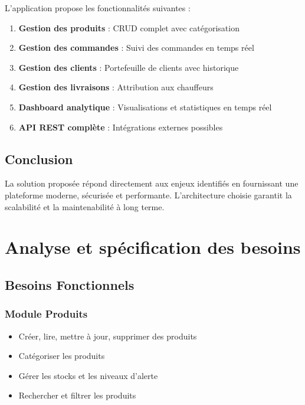 \documentclass[12pt,a4paper]{report}
\begin{document}
L'application propose les fonctionnalités suivantes :

\begin{enumerate}
    \item \textbf{Gestion des produits} : CRUD complet avec catégorisation
    \item \textbf{Gestion des commandes} : Suivi des commandes en temps réel
    \item \textbf{Gestion des clients} : Portefeuille de clients avec historique
    \item \textbf{Gestion des livraisons} : Attribution aux chauffeurs
    \item \textbf{Dashboard analytique} : Visualisations et statistiques en temps réel
    \item \textbf{API REST complète} : Intégrations externes possibles
\end{enumerate}

\section{Conclusion}

La solution proposée répond directement aux enjeux identifiés en fournissant une plateforme moderne, sécurisée et performante. L'architecture choisie garantit la scalabilité et la maintenabilité à long terme.

\newpage

\chapter{Analyse et spécification des besoins}

\section{Besoins Fonctionnels}

\subsection{Module Produits}
\begin{itemize}
    \item Créer, lire, mettre à jour, supprimer des produits
    \item Catégoriser les produits
    \item Gérer les stocks et les niveaux d'alerte
    \item Rechercher et filtrer les produits
\end{itemize}
\end{document}
